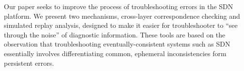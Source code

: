 Our paper seeks to improve the process of troubleshooting errors in the SDN
platform. We present two mechanisms, cross-layer correspondence checking
and simulated replay analysis, 
designed to make it easier for troubleshooter to ``see through the noise'' of
diagnostic information. These tools are based on the observation that 
troubleshooting eventually-consistent systems such as SDN essentially
involves differentiating common, ephemeral inconsistencies form persistent
errors. 
